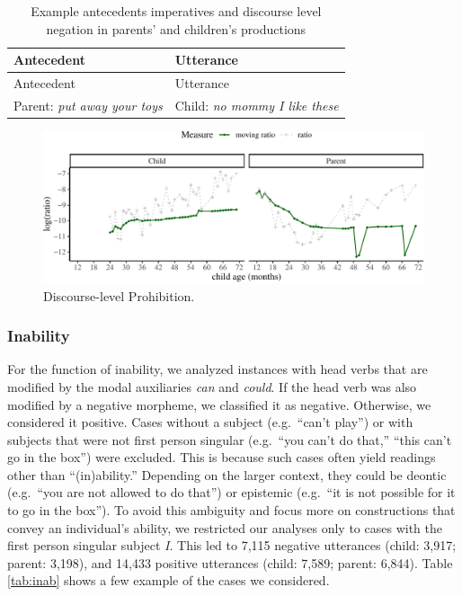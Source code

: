 \documentclass[
  english,
  man,floatsintext]{apa6}
\begin{document}
\begin{longtable}[]{@{}ll@{}}
\caption{\label{tab:disprohib} Example antecedents imperatives and discourse level negation in parents' and children's productions}\tabularnewline
\toprule
Antecedent & Utterance \\
\midrule
\endfirsthead
\toprule
Antecedent & Utterance \\
\midrule
\endhead
Parent: \emph{put away your toys} & Child: \emph{no mommy I like these} \\
\bottomrule
\end{longtable}

\begin{figure}[H]

{\centering \includegraphics{neg_construction_article_files/figure-latex/prohibitiondiscourse-1} 

}

\caption{Discourse-level Prohibition.}\label{fig:prohibitiondiscourse}
\end{figure}

\hypertarget{inability}{%
\subsubsection{Inability}\label{inability}}

For the function of inability, we analyzed instances with head verbs that are modified by the modal auxiliaries \emph{can} and \emph{could}. If the head verb was also modified by a negative morpheme, we classified it as negative. Otherwise, we considered it positive. Cases without a subject (e.g.~``can't play'') or with subjects that were not first person singular (e.g.~``you can't do that,'' ``this can't go in the box'') were excluded. This is because such cases often yield readings other than ``(in)ability.'' Depending on the larger context, they could be deontic (e.g.~``you are not allowed to do that'') or epistemic (e.g.~``it is not possible for it to go in the box''). To avoid this ambiguity and focus more on constructions that convey an individual's ability, we restricted our analyses only to cases with the first person singular subject \emph{I}. This led to 7,115 negative utterances (child: 3,917; parent: 3,198), and 14,433 positive utterances (child: 7,589; parent: 6,844). Table \ref{tab:inab} shows a few example of the cases we considered.
\end{document}
